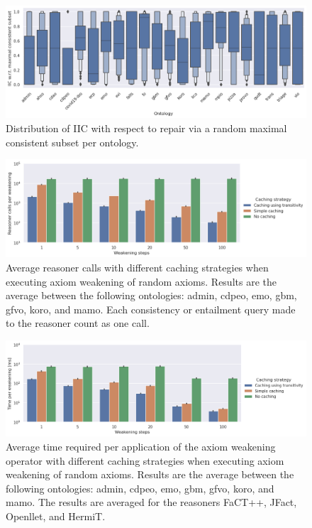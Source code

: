 \begin{figure}[ht]
    \begin{widepage}
      \centering
      \includegraphics[width=\textwidth]{resources/iic-mcs-ontology-violin.png}
    \end{widepage}
    \caption{Distribution of IIC with respect to repair via a random maximal consistent subset per ontology.}
\end{figure}

\begin{figure}[ht]
    \begin{widepage}
      \centering
      \includegraphics[width=\textwidth]{resources/calls-cache-bar.png}
    \end{widepage}
    \caption{Average reasoner calls with different caching strategies when executing axiom weakening of random axioms. Results are the average between the following ontologies: admin, cdpeo, emo, gbm, gfvo, koro, and mamo. Each consistency or entailment query made to the reasoner count as one call.}
\end{figure}

\begin{figure}[ht]
    \begin{widepage}
      \centering
      \includegraphics[width=\textwidth]{resources/time-cache-bar.png}
    \end{widepage}
    \caption{Average time required per application of the axiom weakening operator with different caching strategies when executing axiom weakening of random axioms. Results are the average between the following ontologies: admin, cdpeo, emo, gbm, gfvo, koro, and mamo. The results are averaged for the reasoners FaCT++, JFact, Openllet, and HermiT.}
\end{figure}

